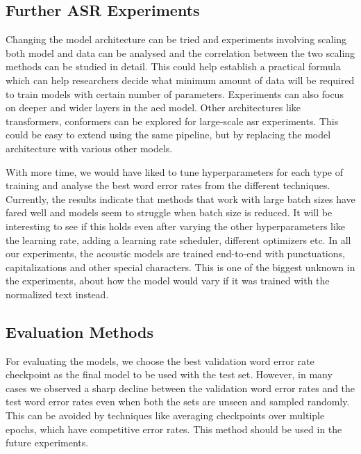\subsection{Further ASR Experiments}
Changing the model architecture can be tried and experiments involving scaling both model and data can be analysed and the correlation between the two scaling methods can be studied in detail. This could help establish a practical formula which can help researchers decide what minimum amount of data will be required to train models with certain number of parameters. Experiments can also focus on deeper and wider layers in the \acrshort{aed} model. Other architectures like transformers\cite{Vaswani2017AttentionNeed}, conformers\cite{Gulati2020Conformer:Recognition} can be explored for large-scale \acrshort{asr} experiments. This could be easy to extend using the same pipeline, but by replacing the model architecture with various other models.

With more time, we would have liked to tune hyperparameters for each type of training and analyse the best word error rates from the different techniques. Currently, the results indicate that methods that work with large batch sizes have fared well and models seem to struggle when batch size is reduced. It will be interesting to see if this holds even after varying the other hyperparameters like the learning rate, adding a learning rate scheduler, different optimizers etc. In all our experiments, the acoustic models are trained end-to-end with punctuations, capitalizations and other special characters. This is one of the biggest unknown in the experiments, about how the model would vary if it was trained with the normalized text instead. 

\subsection{Evaluation Methods}
For evaluating the models, we choose the best validation word error rate checkpoint as the final model to be used with the test set. However, in many cases we observed a sharp decline between the validation word error rates and the test word error rates even when both the sets are unseen and sampled randomly. This can be avoided by techniques like averaging checkpoints over multiple epochs, which have competitive error rates. This method should be used in the future experiments.